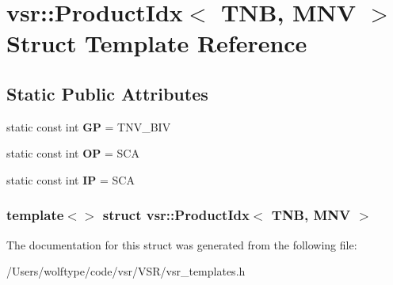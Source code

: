 \hypertarget{structvsr_1_1_product_idx_3_01_t_n_b_00_01_m_n_v_01_4}{\section{vsr\-:\-:Product\-Idx$<$ T\-N\-B, M\-N\-V $>$ Struct Template Reference}
\label{structvsr_1_1_product_idx_3_01_t_n_b_00_01_m_n_v_01_4}
}
\subsection*{Static Public Attributes}
\begin{DoxyCompactItemize}
\item 
\hypertarget{structvsr_1_1_product_idx_3_01_t_n_b_00_01_m_n_v_01_4_a92a113a2f548e53ae8d56d9b9aab0646}{static const int {\bfseries G\-P} = T\-N\-V\-\_\-\-B\-I\-V}\label{structvsr_1_1_product_idx_3_01_t_n_b_00_01_m_n_v_01_4_a92a113a2f548e53ae8d56d9b9aab0646}

\item 
\hypertarget{structvsr_1_1_product_idx_3_01_t_n_b_00_01_m_n_v_01_4_a9fd8505197f3d9544b5941c5609106ac}{static const int {\bfseries O\-P} = S\-C\-A}\label{structvsr_1_1_product_idx_3_01_t_n_b_00_01_m_n_v_01_4_a9fd8505197f3d9544b5941c5609106ac}

\item 
\hypertarget{structvsr_1_1_product_idx_3_01_t_n_b_00_01_m_n_v_01_4_aa2e5105fbb293ae3c597d9438185d44a}{static const int {\bfseries I\-P} = S\-C\-A}\label{structvsr_1_1_product_idx_3_01_t_n_b_00_01_m_n_v_01_4_aa2e5105fbb293ae3c597d9438185d44a}

\end{DoxyCompactItemize}
\subsubsection*{template$<$$>$ struct vsr\-::\-Product\-Idx$<$ T\-N\-B, M\-N\-V $>$}



The documentation for this struct was generated from the following file\-:\begin{DoxyCompactItemize}
\item 
/\-Users/wolftype/code/vsr/\-V\-S\-R/vsr\-\_\-templates.\-h\end{DoxyCompactItemize}
